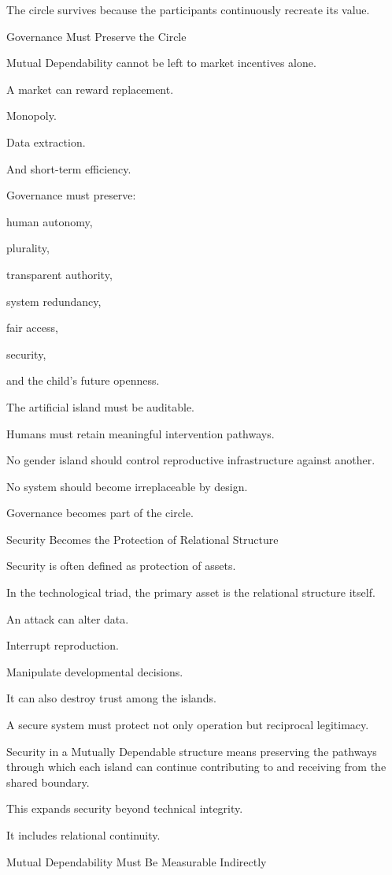 The circle survives because the participants continuously recreate its value.

Governance Must Preserve the Circle

Mutual Dependability cannot be left to market incentives alone.

A market can reward replacement.

Monopoly.

Data extraction.

And short-term efficiency.

Governance must preserve:

human autonomy,

plurality,

transparent authority,

system redundancy,

fair access,

security,

and the child’s future openness.

The artificial island must be auditable.

Humans must retain meaningful intervention pathways.

No gender island should control reproductive infrastructure against another.

No system should become irreplaceable by design.

Governance becomes part of the circle.

Security Becomes the Protection of Relational Structure

Security is often defined as protection of assets.

In the technological triad, the primary asset is the relational structure itself.

An attack can alter data.

Interrupt reproduction.

Manipulate developmental decisions.

It can also destroy trust among the islands.

A secure system must protect not only operation but reciprocal legitimacy.

Security in a Mutually Dependable structure means preserving the pathways through which each island can continue contributing to and receiving from the shared boundary.

This expands security beyond technical integrity.

It includes relational continuity.

Mutual Dependability Must Be Measurable Indirectly

